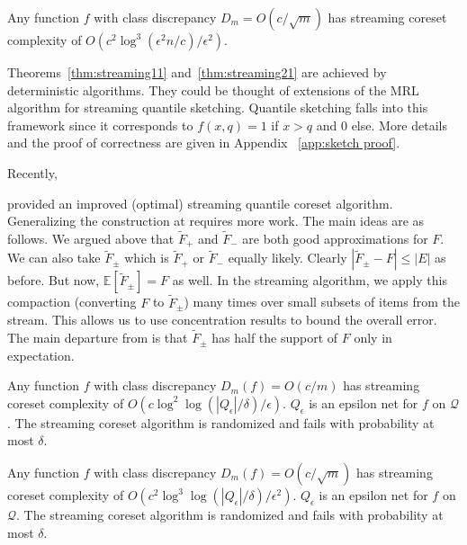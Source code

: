 \documentclass[anon,12pt]{colt2019} %
\newcommand{\E}{\mathbb{E}}
\newcommand{\eps}{\epsilon}
\newcommand{\Q}{\mathcal{Q}}
\begin{document}
\begin{theorem} \label{thm:streaming21}
Any function $f$ with class discrepancy $D_m = O(c/\sqrt{m})$ has streaming coreset complexity of $O\left(c^2\log^3(\eps^2 n/c) /\eps^2\right)$.
\end{theorem}

Theorems~\ref{thm:streaming11} and~\ref{thm:streaming21} are achieved by deterministic algorithms. 
They could be thought of extensions of the MRL algorithm \cite{MRL} for streaming quantile sketching. 
Quantile sketching falls into this framework since it corresponds to $f(x,q) = 1$ if $x>q$ and $0$ else. 
More details and the proof of correctness are given in Appendix ~\ref{app:sketch proof}.

Recently, {\cite{DBLP:conf/focs/KarninLL16} provided an improved (optimal) streaming quantile coreset algorithm. 
Generalizing the construction at  \cite{DBLP:conf/focs/KarninLL16} requires more work. 
The main ideas are as follows. 
We argued above that $\tilde F_{+}$ and $\tilde F_{-}$ are both good approximations for $F$. 
We can also take $\tilde F_{\pm}$ which is $\tilde F_{+}$ or $\tilde F_{-}$ equally likely. 
Clearly $|\tilde F_{\pm} - F| \le |E|$ as before. But now, $\E[\tilde F_{\pm}] = F$ as well. 
In the streaming algorithm, we apply this compaction (converting $F$ to $\tilde F_{\pm}$) many times over small subsets of items from the stream. This allows us to use concentration results to bound the overall error. 
The main departure from \cite{DBLP:conf/focs/KarninLL16} is that $\tilde F_{\pm}$ has half the support of $F$ only in expectation.

\begin{theorem} \label{thm:streaming12}
Any function $f$ with class discrepancy $D_m(f) = O(c/m)$ has streaming coreset complexity of $O\left(c\log^2\log(|Q_\eps|/\delta)/\eps\right)$.
$Q_\eps$ is an epsilon net for $f$ on $\Q$. 
The streaming coreset algorithm is randomized and fails with probability at most $\delta$.
\end{theorem}

\begin{theorem} \label{thm:streaming22}
Any function $f$ with class discrepancy $D_m(f) = O(c/\sqrt{m})$ has streaming coreset complexity of $O\left(c^2\log^3\log(|Q_\eps|/\delta) /\eps^2\right)$.
$Q_\eps$ is an epsilon net for $f$ on $\Q$. 
The streaming coreset algorithm is randomized and fails with probability at most $\delta$.
\end{theorem}

}
\end{document}

